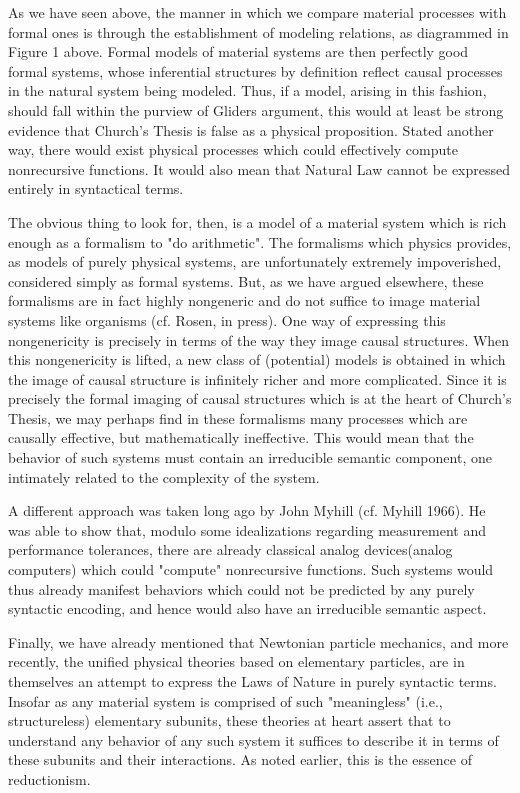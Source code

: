 \documentclass[a4paper,12pt]{article}
\begin{document}
As we have seen above, the manner in which we compare material processes with formal ones is through the establishment of
modeling relations, as diagrammed in Figure 1 above. Formal models of material systems are
then perfectly good formal systems, whose inferential structures by definition reflect causal processes in the natural system being modeled.
Thus, if a model, arising in this fashion, should fall within the purview of Gliders
argument, this would at least be strong evidence that Church's Thesis is
false as a physical proposition. Stated another way, there would exist physical processes which could effectively compute
nonrecursive functions. It would also mean that Natural Law cannot be expressed entirely in syntactical terms.

The obvious thing to look for, then, is a model of a material system
which is rich enough as a formalism to "do arithmetic". The formalisms
which physics provides, as models of purely physical systems, are unfortunately
extremely impoverished, considered simply as formal systems. But,
as we have argued elsewhere, these formalisms are in fact highly nongeneric
and do not suffice to image material systems like organisms (cf. Rosen, in
press). One way of expressing this nongenericity is precisely in terms of the
way they image causal structures. When this nongenericity is lifted, a new
class of (potential) models is obtained in which the image of causal structure
is infinitely richer and more complicated. Since it is precisely the formal
imaging of causal structures which is at the heart of Church's Thesis, we may perhaps find in these formalisms many processes
which are causally effective, but mathematically ineffective. This would mean that the behavior of such systems must contain
an irreducible semantic component, one intimately related to the complexity of the system.

A different approach was taken long ago by John Myhill (cf. Myhill 1966).
He was able to show that, modulo some idealizations regarding measurement and performance tolerances, there are already
classical analog devices(analog computers) which could "compute" nonrecursive functions. Such systems would thus already
manifest behaviors which could not be predicted by any purely syntactic encoding, and hence would also have an irreducible
semantic aspect.

Finally, we have already mentioned that Newtonian particle mechanics, and more recently, the unified physical theories based on elementary particles,
are in themselves an attempt to express the Laws of Nature in purely syntactic terms. Insofar as any material system is comprised of such "meaningless"
(i.e., structureless) elementary subunits, these theories at heart assert that to understand any behavior of any
such system it suffices to describe it in terms of these subunits and their interactions. As noted earlier, this is the essence of reductionism.
\end{document}
